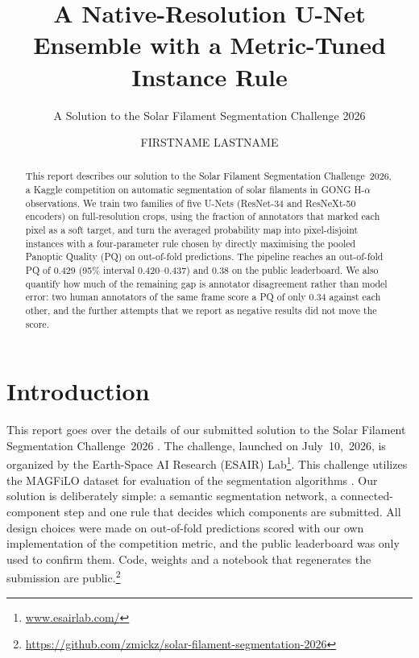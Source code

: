 \documentclass[sigconf]{acmart}
\begin{document}
\title{A Native-Resolution U-Net Ensemble with a Metric-Tuned Instance Rule}
\subtitle{A Solution to the Solar Filament Segmentation Challenge 2026} %

\author{FIRSTNAME LASTNAME}   %

\begin{abstract}
    This report describes our solution to the Solar Filament Segmentation Challenge~2026, a Kaggle competition on automatic segmentation of solar filaments in GONG H-$\alpha$ observations. We train two families of five U-Nets (ResNet-34 and ResNeXt-50 encoders) on full-resolution crops, using the fraction of annotators that marked each pixel as a soft target, and turn the averaged probability map into pixel-disjoint instances with a four-parameter rule chosen by directly maximising the pooled Panoptic Quality (PQ) on out-of-fold predictions. The pipeline reaches an out-of-fold PQ of $0.429$ (95\% interval $0.420$--$0.437$) and $0.38$ on the public leaderboard. We also quantify how much of the remaining gap is annotator disagreement rather than model error: two human annotators of the same frame score a PQ of only $0.34$ against each other, and the further attempts that we report as negative results did not move the score.
\end{abstract}

\maketitle

\section{Introduction}
    This report goes over the details of our submitted solution to the Solar Filament Segmentation Challenge~2026 \cite{filament-segmentation-2026}. The challenge, launched on July~10,~2026, is organized by the Earth-Space AI Research (ESAIR) Lab\footnote{\href{https://www.esairlab.com/home}{www.esairlab.com/}}. This challenge utilizes the MAGFiLO dataset for evaluation of the segmentation algorithms \cite{ahmadzadeh2024dataset}.
    Our solution is deliberately simple: a semantic segmentation network, a connected-component step and one rule that decides which components are submitted. All design choices were made on out-of-fold predictions scored with our own implementation of the competition metric, and the public leaderboard was only used to confirm them. Code, weights and a notebook that regenerates the submission are public.\footnote{\url{https://github.com/zmickz/solar-filament-segmentation-2026}}
\end{document}
